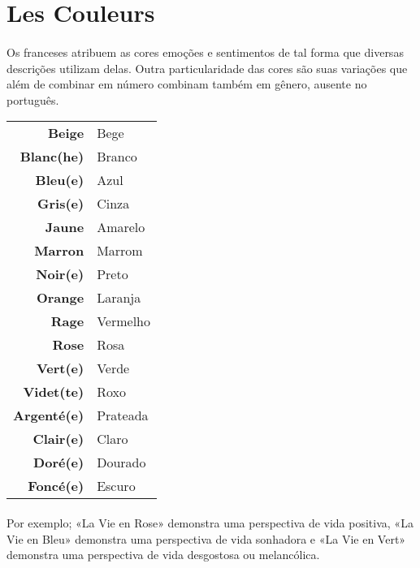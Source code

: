 \documentclass{article}
\begin{document}
\section{Les Couleurs}
    \paragraph{}Os franceses atribuem as cores emoções e sentimentos de tal forma que diversas descrições utilizam delas. Outra particularidade das cores são suas variações que além de combinar em número combinam também em gênero, ausente no português.
    
        \begin{center}
            \begin{tabular}{r l}
                \textbf{Beige}     & Bege\\
                \textbf{Blanc(he)} & Branco\\        
                \textbf{Bleu(e)}   & Azul\\
                \textbf{Gris(e)}   & Cinza\\    
                \textbf{Jaune}     & Amarelo\\
                \textbf{Marron}    & Marrom\\
                \textbf{Noir(e)}   & Preto\\
                \textbf{Orange}    & Laranja\\ 
                \textbf{Rage}      & Vermelho\\         
                \textbf{Rose}      & Rosa\\
                \textbf{Vert(e)}   & Verde\\
                \textbf{Videt(te)} & Roxo\\[2.5ex]

                \textbf{Argenté(e)} & Prateada\\
                \textbf{Clair(e)}   & Claro\\
                \textbf{Doré(e)}    & Dourado\\
                \textbf{Foncé(e)}   & Escuro\\ 
            \end{tabular}
        \end{center}    
    
    \paragraph{}Por exemplo; «La Vie en Rose» demonstra uma perspectiva de vida positiva, «La Vie en Bleu» demonstra uma perspectiva de vida sonhadora e «La Vie en Vert» demonstra uma perspectiva de vida desgostosa ou melancólica.
        
\end{document}
